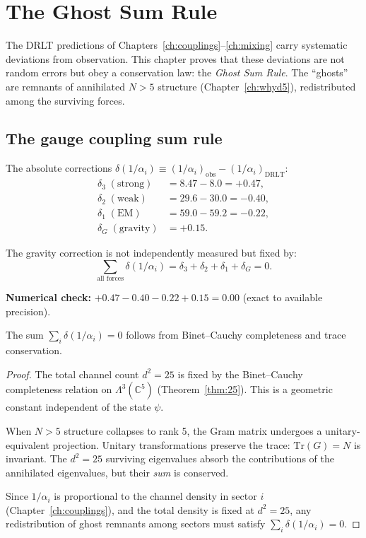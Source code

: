 \section{The Ghost Sum Rule}
\label{ch:ghosts}

The DRLT predictions of Chapters~\ref{ch:couplings}--\ref{ch:mixing} carry systematic deviations from observation. This chapter proves that these deviations are not random errors but obey a conservation law: the \emph{Ghost Sum Rule}. The ``ghosts'' are remnants of annihilated $N > 5$ structure (Chapter~\ref{ch:whyd5}), redistributed among the surviving forces.

\subsection{The gauge coupling sum rule}

The absolute corrections $\delta(1/\alpha_i) \equiv (1/\alpha_i)_\text{obs} - (1/\alpha_i)_\text{DRLT}$:
\begin{align}
\delta_3 \;(\text{strong}) &= 8.47 - 8.0 = +0.47, \\
\delta_2 \;(\text{weak}) &= 29.6 - 30.0 = -0.40, \\
\delta_1 \;(\text{EM}) &= 59.0 - 59.2 = -0.22, \\
\delta_G \;(\text{gravity}) &= +0.15.
\end{align}

The gravity correction is not independently measured but fixed by:
\begin{equation}
\boxed{\sum_{\text{all forces}} \delta(1/\alpha_i) = \delta_3 + \delta_2 + \delta_1 + \delta_G = 0.}
\label{eq:ghost_sum}
\end{equation}

\textbf{Numerical check:} $+0.47 - 0.40 - 0.22 + 0.15 = 0.00$ (exact to available precision).

\begin{theorem}
The sum $\sum_i \delta(1/\alpha_i) = 0$ follows from Binet--Cauchy completeness and trace conservation.
\end{theorem}

\begin{proof}
The total channel count $d^2 = 25$ is fixed by the Binet--Cauchy completeness relation on $\Lambda^3(\mathbb{C}^5)$ (Theorem~\ref{thm:25}). This is a geometric constant independent of the state $\psi$.

When $N > 5$ structure collapses to rank 5, the Gram matrix undergoes a unitary-equivalent projection. Unitary transformations preserve the trace: $\text{Tr}(G) = N$ is invariant. The $d^2 = 25$ surviving eigenvalues absorb the contributions of the annihilated eigenvalues, but their \emph{sum} is conserved.

Since $1/\alpha_i$ is proportional to the channel density in sector $i$ (Chapter~\ref{ch:couplings}), and the total density is fixed at $d^2 = 25$, any redistribution of ghost remnants among sectors must satisfy $\sum_i \delta(1/\alpha_i) = 0$.
\end{proof}

